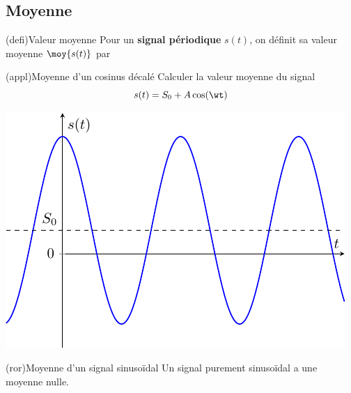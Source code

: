 \documentclass[../../main/main.tex]{subfiles}
\begin{document}
\subsection{Moyenne}
\begin{tcb*}(defi){Valeur moyenne}
	Pour un \textbf{signal périodique} $s(t)$, on définit sa valeur moyenne
	$\moy{s(t)}$ par
	\psw{
		\[
			\moy{s(t)} = \frac{1}{T}\int _{0}^{T} s(t) \dd{t}
		\]
	}
	\vspace{-15pt}
\end{tcb*}

\begin{tcb*}[sidebyside, lefthand ratio=.4](appl){Moyenne d'un cosinus décalé}
	Calculer la valeur moyenne du signal
	\[
		s(t) = S_0 + A\cos(\wt)
	\]
	\begin{center}
		\includegraphics[width=\linewidth]{moy_cos-S0}
	\end{center}
	\tcblower
	\vspace{-15pt}
\end{tcb*}
\begin{tcb*}(ror){Moyenne d'un signal sinusoïdal}
	Un signal purement sinusoïdal a une moyenne nulle.
\end{tcb*}
\end{document}
